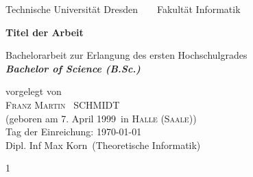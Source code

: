 \documentclass[a4paper,12pt,leqno]{article}
\newcommand{\name}{Schmidt}
\newcommand{\vorname}{Franz Martin}
\newcommand{\gebdatum}{7. April 1999}
\newcommand{\ort}{Halle (Saale)}
\newcommand{\betreuer}{Dipl. Inf Max Korn}
\newcommand{\institut}{Theoretische Informatik}
\newcommand{\thema}{Titel der Arbeit}
\newcommand{\datum}{\today} %
\begin{document}


\thispagestyle{empty}

\begin{center}
{\Large Technische Universit\"{a}t Dresden\  \ \textbullet\ \ Fakult\"{a}t Informatik}

\vfil

{\bfseries\Huge\thema}

\vfil
{\LARGE
Bachelorarbeit zur Erlangung des ersten Hochschulgrades \\[\bigskipamount]
\bfseries{\itshape Bachelor of Science (B.Sc.)}\\[\bigskipamount]
}

\vfil\vfil

\vfil

vorgelegt von
\\[\bigskipamount]
\textsc{\vorname\ } \MakeUppercase{\name}
\\[\bigskipamount]
(geboren am \gebdatum\ in \textsc{\ort})
\\[\bigskipamount]
Tag der Einreichung: \datum
\\[\bigskipamount]
\betreuer\ (\institut)
\end{center}

\cleardoublepage

\tableofcontents

\thispagestyle{empty}
\cleardoublepage


\setcounter{page}1























%


\end{document}
